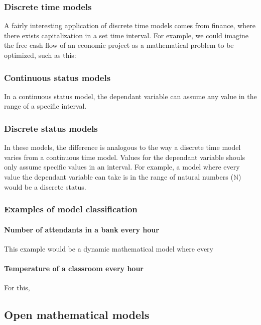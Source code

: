 \documentclass{textbook}
\begin{document}
\subsubsection{Discrete time models}

A fairly interesting application of discrete time models comes from finance, where there exists 
capitalization in a set time interval. For example, we could imagine the free cash flow of an economic project as
a mathematical problem to be optimized, such as this:

\subsubsection{Continuous status models}

In a continuous status model, the dependant variable can assume any value in the range of a specific interval.

\subsubsection{Discrete status models}

In these models, the difference is analogous to the way a discrete time model varies from a continuous
time model. Values for the dependant variable shouls only assume specific values in an interval. For example, a
model where every value the dependant variable can take is in the range of natural numbers ($\mathbb{N}$) would be 
a discrete status.

\subsubsection{Examples of model classification}

\paragraph{Number of attendants in a bank every hour}

This example would be a dynamic mathematical model where every 

\paragraph{Temperature of a classroom every hour}

For this, 

\subsection{Open mathematical models}
\end{document}
